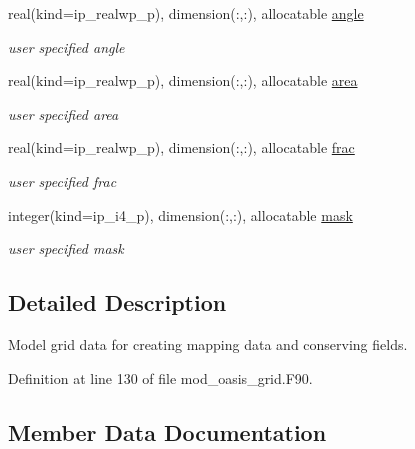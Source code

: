 \begin{DoxyCompactItemize}
real(kind=ip\+\_\+realwp\+\_\+p), dimension(\+:,\+:), allocatable \hyperlink{structmod__oasis__grid_1_1prism__grid__type_a3d12bed9920fed609d83b04ab3fbc5b2}{angle}
\begin{DoxyCompactList}\small\item\em user specified angle \end{DoxyCompactList}\item 
real(kind=ip\+\_\+realwp\+\_\+p), dimension(\+:,\+:), allocatable \hyperlink{structmod__oasis__grid_1_1prism__grid__type_a7dad88f99d9648097a29b6b6f1e25d2e}{area}
\begin{DoxyCompactList}\small\item\em user specified area \end{DoxyCompactList}\item 
real(kind=ip\+\_\+realwp\+\_\+p), dimension(\+:,\+:), allocatable \hyperlink{structmod__oasis__grid_1_1prism__grid__type_ad29eea089d1c004db94828eba6f3003a}{frac}
\begin{DoxyCompactList}\small\item\em user specified frac \end{DoxyCompactList}\item 
integer(kind=ip\+\_\+i4\+\_\+p), dimension(\+:,\+:), allocatable \hyperlink{structmod__oasis__grid_1_1prism__grid__type_ae50e83035d6214d862be48a5060887ae}{mask}
\begin{DoxyCompactList}\small\item\em user specified mask \end{DoxyCompactList}\end{DoxyCompactItemize}


\subsection{Detailed Description}
Model grid data for creating mapping data and conserving fields. 

Definition at line 130 of file mod\+\_\+oasis\+\_\+grid.\+F90.



\subsection{Member Data Documentation}
\mbox{\label{structmod__oasis__grid_1_1prism__grid__type_a3d12bed9920fed609d83b04ab3fbc5b2}} 

